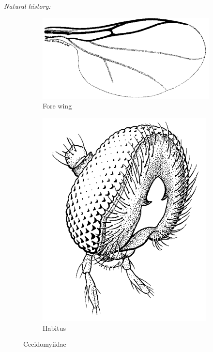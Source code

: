 \documentclass[letterpaper, 11pt]{article}
\begin{document}
\noindent{}\textit{Natural history:} \\

\begin{figure}[ht!]
    \centering
    \begin{subfigure}[ht!]{0.45\textwidth}
        \includegraphics[width=\textwidth]{CecidomyiidWing}
        \caption{Fore wing \citep[][Fig. 16.13]{mcalpine1981manual}}
        \label{fig:cecidomyiid1}
    \end{subfigure}
    \qquad
    \begin{subfigure}[ht!]{0.25\textwidth}
        \includegraphics[width=\textwidth]{CecidomyiidHead}
        \caption{Habitus \citep[][Fig. 16.2]{mcalpine1981manual}}
        \label{fig:cecidomyiid2}
    \end{subfigure}
    \caption{Cecidomyiidae}\label{fig:cecidomyiids}
\end{figure}
\end{document}
